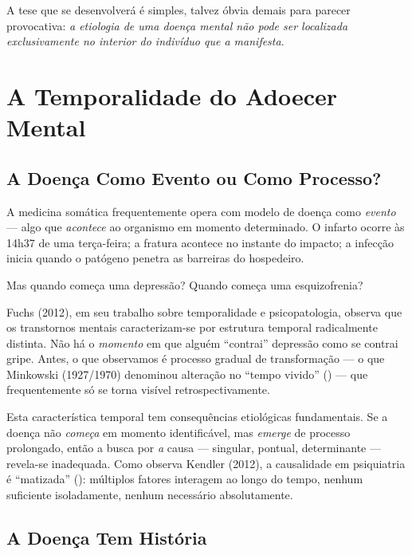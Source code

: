 A tese que se desenvolverá é simples, talvez óbvia demais para parecer provocativa: \textit{a etiologia de uma doença mental não pode ser localizada exclusivamente no interior do indivíduo que a manifesta}.

\section{A Temporalidade do Adoecer Mental}
\label{sec:temporalidade}

\subsection{A Doença Como Evento ou Como Processo?}

A medicina somática frequentemente opera com modelo de doença como \textit{evento} --- algo que \textit{acontece} ao organismo em momento determinado. O infarto ocorre às 14h37 de uma terça-feira; a fratura acontece no instante do impacto; a infecção inicia quando o patógeno penetra as barreiras do hospedeiro.

Mas quando começa uma depressão? Quando começa uma esquizofrenia?

Fuchs (2012), em seu trabalho sobre temporalidade e psicopatologia, observa que os transtornos mentais caracterizam-se por estrutura temporal radicalmente distinta. Não há o \textit{momento} em que alguém \enquote{contrai} depressão como se contrai gripe. Antes, o que observamos é processo gradual de transformação --- o que Minkowski (1927/1970) denominou alteração no \enquote{tempo vivido} () --- que frequentemente só se torna visível retrospectivamente.

Esta característica temporal tem consequências etiológicas fundamentais. Se a doença não \textit{começa} em momento identificável, mas \textit{emerge} de processo prolongado, então a busca por \textit{a} causa --- singular, pontual, determinante --- revela-se inadequada. Como observa Kendler (2012), a causalidade em psiquiatria é \enquote{matizada} (): múltiplos fatores interagem ao longo do tempo, nenhum suficiente isoladamente, nenhum necessário absolutamente.

\subsection{A Doença Tem História}

